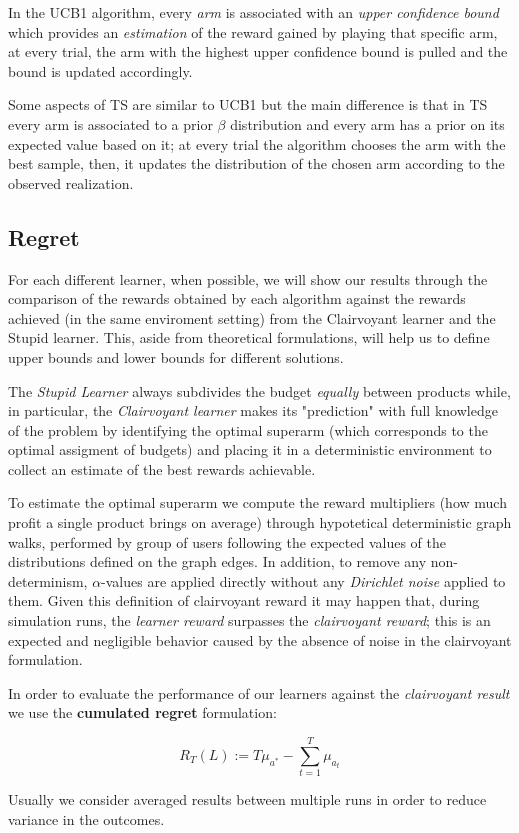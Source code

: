 In the UCB1 algorithm, every \textit{arm} is associated with an \textit{upper confidence bound} which provides an \textit{estimation} of the reward gained by playing that specific arm, at every trial, the arm with the highest upper confidence bound is pulled and the bound is updated accordingly.

Some aspects of TS are similar to UCB1 but the main difference is that in TS every arm is associated to a prior $\beta$ distribution and every arm has a prior on its expected value based on it; at every trial the algorithm chooses the arm with the best sample, then, it updates the distribution of the chosen arm according to the observed realization.

\subsection{Regret}

For each different learner, when possible, we will show our results through the comparison of the rewards obtained by each algorithm against the rewards achieved (in the same enviroment setting) from the Clairvoyant learner and the Stupid learner.
This, aside from theoretical formulations, will help us to define upper bounds and lower bounds for different solutions.

The \textit{Stupid Learner} always subdivides the budget \textit{equally} between products while, in particular, the \textit{Clairvoyant learner} makes its "prediction" with full knowledge of the problem by identifying the optimal superarm (which corresponds to the optimal assigment of budgets) and placing it in a deterministic environment to collect an estimate of the best rewards achievable.

To estimate the optimal superarm we compute the reward multipliers (how much profit a single product brings on average) through hypotetical deterministic graph walks, performed by group of users following the expected values of the distributions defined on the graph edges.
In addition, to remove any non-determinism, $\alpha$-values are applied directly without any \textit{Dirichlet noise} applied to them.
Given this definition of clairvoyant reward it may happen that, during simulation runs, the \textit{learner reward} surpasses the \textit{clairvoyant reward}; this is an expected and negligible behavior caused by the absence of noise in the clairvoyant formulation.

In order to evaluate the performance of our learners against the \textit{clairvoyant result} we use the \textbf{cumulated regret} formulation:

\begin{displaymath}
    R_T(L) := T\mu_{a^*} - \sum_{t = 1}^T \mu_{a_t}
\end{displaymath}

Usually we consider averaged results between multiple runs in order to reduce variance in the outcomes.
